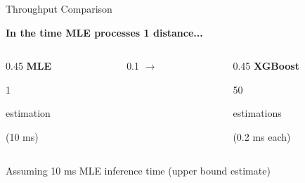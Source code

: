 \documentclass[aspectratio=169]{beamer}
\begin{document}
\begin{frame}{Throughput Comparison}

    \centering

    \textbf{In the time MLE processes 1 distance...}

    \vspace{0.8cm}

    \begin{columns}[c]
        \begin{column}{0.45\textwidth}
            \centering
            {\Large\textbf{MLE}}

            \vspace{0.5cm}

            {\Huge 1}

            \vspace{0.3cm}

            {\footnotesize estimation}

            \vspace{0.3cm}

            {\small (10 ms)}
        \end{column}

        \begin{column}{0.1\textwidth}
            \centering
            {\Huge$\rightarrow$}
        \end{column}

        \begin{column}{0.45\textwidth}
            \centering
            {\Large\textbf{XGBoost}}

            \vspace{0.5cm}

            {\Huge 50}

            \vspace{0.3cm}

            {\footnotesize estimations}

            \vspace{0.3cm}

            {\small (0.2 ms each)}
        \end{column}
    \end{columns}

    \vspace{1cm}

    {\footnotesize Assuming 10 ms MLE inference time (upper bound estimate)}

\end{frame}
\end{document}
